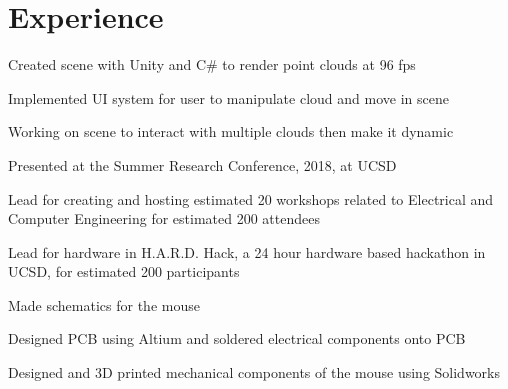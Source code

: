 \documentclass[]{deedy-resume-openfont}
\begin{document}
\begin{minipage}[t]{0.66\textwidth} 


\section{Experience}

\sectionsep
\begin{tightemize}
\item Created scene with Unity and C\# to render point clouds at 96 fps
\item Implemented UI system for user to manipulate cloud and move in scene
\item Working on scene to interact with multiple clouds then make it dynamic
\item Presented at the Summer Research Conference, 2018, at UCSD
\end{tightemize}
\sectionsep

\begin{tightemize}
\item Lead for creating and hosting estimated 20 workshops related to Electrical and Computer Engineering for estimated 200 attendees
\item Lead for hardware in H.A.R.D. Hack, a 24 hour hardware based hackathon in UCSD, for estimated 200 participants
\end{tightemize}
\sectionsep


\begin{tightemize}
\item Made schematics for the mouse
\item Designed PCB using Altium and soldered electrical components onto PCB
\item Designed and 3D printed mechanical components of the mouse using Solidworks
\end{tightemize}
\sectionsep


\end{minipage}
\end{document}
